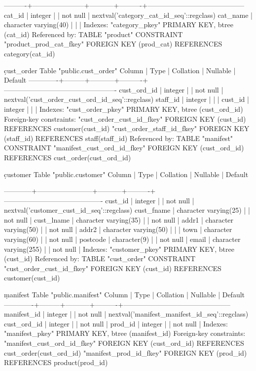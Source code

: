 \begin{enumerate}
\begin{pseudo*}
----------+-----------------------+-----------+----------+------------------------------------------
cat_id   | integer               |           | not null | nextval('category_cat_id_seq'::regclass)
cat_name | character varying(40) |           |          | 
Indexes:
"category_pkey" PRIMARY KEY, btree (cat_id)
Referenced by:
TABLE "product" CONSTRAINT "product_prod_cat_fkey" FOREIGN KEY (prod_cat) REFERENCES category(cat_id)

\d cust_order
 Table "public.cust_order"
Column    |  Type   | Collation | Nullable |                     Default
-------------+---------+-----------+----------+-------------------------------------------------
cust_ord_id | integer |           | not null | nextval('cust_order_cust_ord_id_seq'::regclass)
staff_id    | integer |           |          | 
cust_id     | integer |           |          | 
Indexes:
"cust_order_pkey" PRIMARY KEY, btree (cust_ord_id)
Foreign-key constraints:
"cust_order_cust_id_fkey" FOREIGN KEY (cust_id) REFERENCES customer(cust_id)
"cust_order_staff_id_fkey" FOREIGN KEY (staff_id) REFERENCES staff(staff_id)
Referenced by:
TABLE "manifest" CONSTRAINT "manifest_cust_ord_id_fkey" FOREIGN KEY (cust_ord_id) REFERENCES cust_order(cust_ord_id)

\d customer
      Table "public.customer"
Column   |          Type          | Collation | Nullable |                  Default          

------------+------------------------+-----------+----------+-------------------------------------------
cust_id    | integer                |           | not null | nextval('customer_cust_id_seq'::regclass)
cust_fname | character varying(25)  |           | not null |
cust_lname | character varying(35)  |           | not null |
addr1      | character varying(50)  |           | not null |
addr2      | character varying(50)  |           |          |
town       | character varying(60)  |           | not null |
postcode   | character(9)           |           | not null |
email      | character varying(255) |           | not null |
Indexes:
"customer_pkey" PRIMARY KEY, btree (cust_id)
Referenced by:
TABLE "cust_order" CONSTRAINT "cust_order_cust_id_fkey" FOREIGN KEY (cust_id) REFERENCES customer(cust_id)

\d manifest
 Table "public.manifest"
Column    |  Type   | Collation | Nullable |                    Default
-------------+---------+-----------+----------+-----------------------------------------------  
manifest_id | integer |           | not null | nextval('manifest_manifest_id_seq'::regclass)   
cust_ord_id | integer |           | not null |
prod_id     | integer |           | not null |
Indexes:
"manifest_pkey" PRIMARY KEY, btree (manifest_id)
Foreign-key constraints:
"manifest_cust_ord_id_fkey" FOREIGN KEY (cust_ord_id) REFERENCES cust_order(cust_ord_id)    
"manifest_prod_id_fkey" FOREIGN KEY (prod_id) REFERENCES product(prod_id)



\end{pseudo*}
\end{enumerate}
